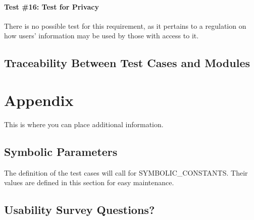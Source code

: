 \documentclass[12pt, titlepage]{article}
\begin{document}
\paragraph*{Test \#16: Test for Privacy}

There is no possible test for this requirement, as it pertains to a regulation on how users' information may be used by those with access to it.


\subsection{Traceability Between Test Cases and Modules}






\newpage

\section{Appendix}

This is where you can place additional information.

\subsection{Symbolic Parameters}

The definition of the test cases will call for SYMBOLIC\_CONSTANTS.
Their values are defined in this section for easy maintenance.

\subsection{Usability Survey Questions?}

\end{document}
